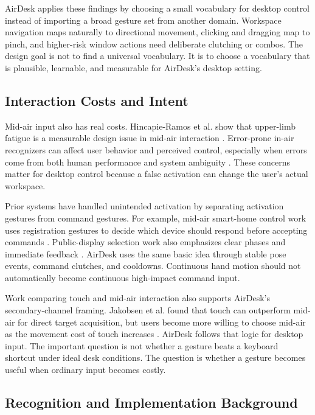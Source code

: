 \documentclass[manuscript]{acmart}
\begin{document}
AirDesk applies these findings by choosing a small vocabulary for desktop control instead of importing a broad gesture set from another domain. Workspace navigation maps naturally to directional movement, clicking and dragging map to pinch, and higher-risk window actions need deliberate clutching or combos. The design goal is not to find a universal vocabulary. It is to choose a vocabulary that is plausible, learnable, and measurable for AirDesk's desktop setting.

\subsection{Interaction Costs and Intent}

Mid-air input also has real costs. Hincapie-Ramos et al. show that upper-limb fatigue is a measurable design issue in mid-air interaction \cite{hincapie2014consumedendurance}. Error-prone in-air recognizers can affect user behavior and perceived control, especially when errors come from both human performance and system ambiguity \cite{arif2014errorprone}. These concerns matter for desktop control because a false activation can change the user's actual workspace.

Prior systems have handled unintended activation by separating activation gestures from command gestures. For example, mid-air smart-home control work uses registration gestures to decide which device should respond before accepting commands \cite{vogiatzidakis2020homedevices}. Public-display selection work also emphasizes clear phases and immediate feedback \cite{walter2014cuenesics}. AirDesk uses the same basic idea through stable pose events, command clutches, and cooldowns. Continuous hand motion should not automatically become continuous high-impact command input.

Work comparing touch and mid-air interaction also supports AirDesk's secondary-channel framing. Jakobsen et al. found that touch can outperform mid-air for direct target acquisition, but users become more willing to choose mid-air as the movement cost of touch increases \cite{jakobsen2015touchmidair}. AirDesk follows that logic for desktop input. The important question is not whether a gesture beats a keyboard shortcut under ideal desk conditions. The question is whether a gesture becomes useful when ordinary input becomes costly.

\subsection{Recognition and Implementation Background}
\end{document}
